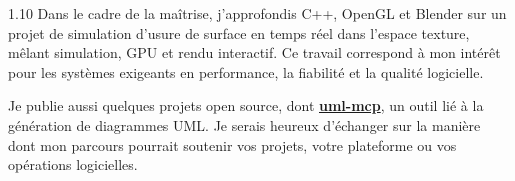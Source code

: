 \documentclass[11pt, a4paper]{../../cv-fr/russell}
\newcommand{\WhyCompany}{}
\begin{document}
\begin{cvletter}
\begin{spacing}{1.10}
Dans le cadre de la maîtrise, j'approfondis C++, OpenGL et Blender sur un projet de simulation d'usure de surface en temps réel dans l'espace texture, mêlant simulation, GPU et rendu interactif. Ce travail correspond à mon intérêt pour les systèmes exigeants en performance, la fiabilité et la qualité logicielle.

\ifdefempty{\WhyCompany}{}{%
\WhyCompany\par
}

Je publie aussi quelques projets open source, dont \textbf{\href{https://github.com/antoinebou12/uml-mcp}{uml-mcp}}, un outil lié à la génération de diagrammes UML. Je serais heureux d'échanger sur la manière dont mon parcours pourrait soutenir vos projets, votre plateforme ou vos opérations logicielles.

\end{spacing}
\end{cvletter}


\makeletterclosing
\end{document}
